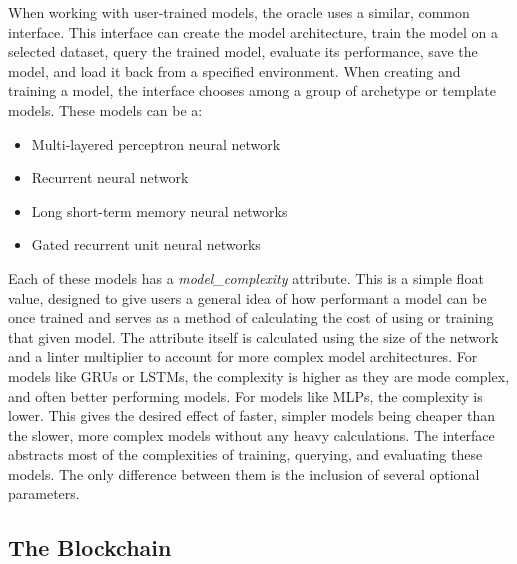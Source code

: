 \documentclass{article}
\begin{document}
    When working with user-trained models, the oracle uses a similar, common interface.  This interface can create the model
    architecture, train the model on a selected dataset, query the trained model, evaluate its performance, save the model,
    and load it back from a specified environment.  When creating and training a model, the interface chooses among a group
    of archetype or template models.  These models can be a:

    \begin{itemize}
        \item Multi-layered perceptron neural network
        \item Recurrent neural network
        \item Long short-term memory neural networks
        \item Gated recurrent unit neural networks
    \end{itemize}

    Each of these models has a \textit{model\_complexity} attribute.  This is a simple float value, designed to give users
    a general idea of how performant a model can be once trained and serves as a method of calculating the cost of using
    or training that given model.  The attribute itself is calculated using the size of the network and a linter multiplier to
    account for more complex model architectures.  For models like GRUs or LSTMs, the complexity is higher as they are mode complex, and often
    better performing models.  For models like MLPs, the complexity is lower.  This gives the desired effect of faster, simpler
    models being cheaper than the slower, more complex models without any heavy calculations.   The interface abstracts most
    of the complexities of training, querying, and evaluating these models.  The only difference between them is the inclusion
    of several optional parameters.

    \subsection{The Blockchain}
\end{document}
